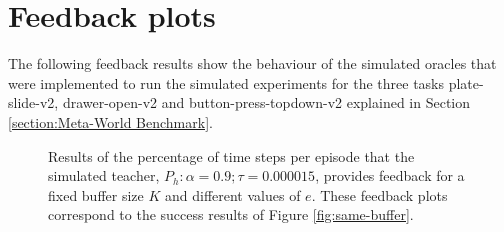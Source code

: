 \chapter{Feedback plots}
\label{appendix:feedback-plots}






The following feedback results show the behaviour of the simulated oracles that were implemented to run the simulated experiments for the three tasks plate-slide-v2, drawer-open-v2 and button-press-topdown-v2 explained in Section \ref{section:Meta-World Benchmark}. 





 \begin{figure}[H]
  \centering
   \hfill
  \hfill
  \caption{Results of the percentage of time steps per episode that the simulated teacher, $P_h: \alpha = 0.9; \tau =  0.000015$,  provides feedback for a fixed buffer size $K$ and different values of $e$. These feedback plots correspond to the success results of Figure \ref{fig:same-buffer}.}
 
  \label{fig:same-buffer-feedback}
\end{figure}



